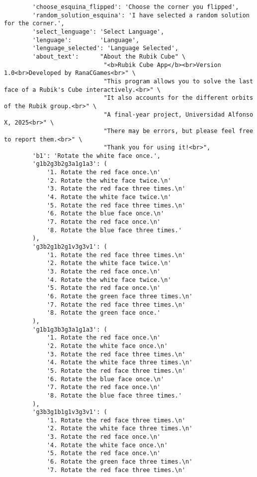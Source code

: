 \begin{lstlisting}
        'choose_esquina_flipped': 'Choose the corner you flipped',
        'random_solution_esquina': 'I have selected a random solution for the corner.',
        'select_lenguage': 'Select Language',
        'lenguage':        'Language',
        'lenguage_selected': 'Language Selected',
        'about_text':      "About the Rubik Cube" \
                            "<b>Rubik Cube App</b><br>Version 1.0<br>Developed by RanaCGames<br>" \
                            "This program allows you to solve the last face of a Rubik's Cube interactively.<br>" \
                            "It also accounts for the different orbits of the Rubik group.<br>" \
                            "A final-year project, Universidad Alfonso X, 2025<br>" \
                            "There may be errors, but please feel free to report them.<br>" \
                            "Thank you for using it!<br>",
        'b1': 'Rotate the white face once.',
        'g1b2g3b2g3a1g1a3': (
            '1. Rotate the red face once.\n'
            '2. Rotate the white face twice.\n'
            '3. Rotate the red face three times.\n'
            '4. Rotate the white face twice.\n'
            '5. Rotate the red face three times.\n'
            '6. Rotate the blue face once.\n'
            '7. Rotate the red face once.\n'
            '8. Rotate the blue face three times.'
        ),
        'g3b2g1b2g1v3g3v1': (
            '1. Rotate the red face three times.\n'
            '2. Rotate the white face twice.\n'
            '3. Rotate the red face once.\n'
            '4. Rotate the white face twice.\n'
            '5. Rotate the red face once.\n'
            '6. Rotate the green face three times.\n'
            '7. Rotate the red face three times.\n'
            '8. Rotate the green face once.'
        ),
        'g1b1g3b3g3a1g1a3': (
            '1. Rotate the red face once.\n'
            '2. Rotate the white face once.\n'
            '3. Rotate the red face three times.\n'
            '4. Rotate the white face three times.\n'
            '5. Rotate the red face three times.\n'
            '6. Rotate the blue face once.\n'
            '7. Rotate the red face once.\n'
            '8. Rotate the blue face three times.'
        ),
        'g3b3g1b1g1v3g3v1': (
            '1. Rotate the red face three times.\n'
            '2. Rotate the white face three times.\n'
            '3. Rotate the red face once.\n'
            '4. Rotate the white face once.\n'
            '5. Rotate the red face once.\n'
            '6. Rotate the green face three times.\n'
            '7. Rotate the red face three times.\n'

\end{lstlisting}
